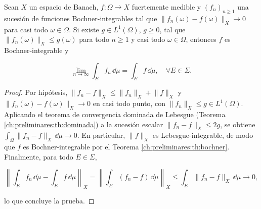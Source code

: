 \begin{Teorema}
\label{ch:preliminares:th:bochnerDominada}

Sean $X$ un espacio de Banach, $f : \Omega \rightarrow X$ fuertemente medible y
$(f_n)_{n \geq 1}$ una sucesión de funciones Bochner-integrables tal que
$\lVert f_n(\omega) - f(\omega) \rVert_X \rightarrow 0$ para casi todo
$\omega \in \Omega$. Si existe $g \in L^1(\Omega)$, $g \geq 0$, tal que
$\lVert f_n(\omega) \rVert_X \leq g(\omega)$ para todo $n \geq 1$ y casi todo
$\omega \in \Omega$, entonces $f$ es Bochner-integrable y

\[\lim_{n \rightarrow \infty} \int_E f_n \, \dd \mu = \int_E f \, \dd \mu, \quad \forall E \in \Sigma.\]
\end{Teorema}

\begin{proof}
Por hipótesis, $\lVert f_n - f \rVert_X \leq \lVert f_n \rVert_X + \lVert f \rVert_X$
y $\lVert f_n(\omega) - f(\omega) \rVert_X \rightarrow 0$ en casi todo punto, con
$\lVert f_n \rVert_X \leq g \in L^1(\Omega)$. Aplicando el teorema de convergencia
dominada de Lebesgue (Teorema \ref{ch:preliminares:th:dominada}) a la sucesión
escalar $\lVert f_n - f \rVert_X \leq 2g$, se obtiene
$\int_\Omega \lVert f_n - f \rVert_X \, \dd \mu \rightarrow 0$. En
particular, $\lVert f \rVert_X$ es Lebesgue-integrable, de modo que $f$ es
Bochner-integrable por el Teorema \ref{ch:preliminares:th:bochner}. Finalmente,
para todo $E \in \Sigma$,

\[\left\lVert \int_E f_n \, \dd \mu - \int_E f \, \dd \mu \right\rVert_X = \left\lVert \int_E (f_n - f) \, \dd \mu \right\rVert_X \leq \int_E \lVert f_n - f \rVert_X \, \dd \mu \rightarrow 0,\]

lo que concluye la prueba.
\end{proof}